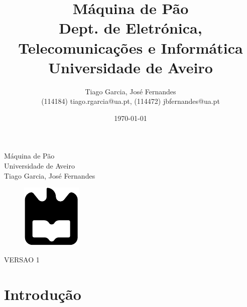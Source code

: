 \documentclass{report}
\begin{document}
%
\def\titulo{Máquina de Pão}
\def\data{DATA}
\def\autores{Tiago Garcia, José Fernandes}
\def\autorescontactos{(114184) tiago.rgarcia@ua.pt, (114472) jbfernandes@ua.pt}
\def\versao{VERSAO 1}
\def\departamento{Dept. de Eletrónica, Telecomunicações e Informática}
\def\empresa{Universidade de Aveiro}
%
%
\begin{titlepage}

\begin{center}
%
\vspace*{50mm}
%
{\Huge \titulo}\\ 
%
\vspace{10mm}
%
{\Large \empresa}\\
%
\vspace{10mm}
%
{\LARGE \autores}\\ 
%
\vspace{30mm}
%
\begin{figure}[h]
\center
\includegraphics{../images/ua}\label{fig:ua-logo}
\end{figure}
%
\vspace{30mm}
\end{center}
%
\begin{flushright}
\versao
\end{flushright}
\end{titlepage}

\title{%
{\Huge\textbf{\titulo}}\\
{\Large \departamento\\ \empresa}
}
%
\author{%
    \autores \\
    \autorescontactos
}
%
\date{\today}
%
\maketitle


\tableofcontents
\listoftables     %
\listoffigures    %


\clearpage
{}

\chapter{Introdução}
\label{ch:introducao}
\end{document}
